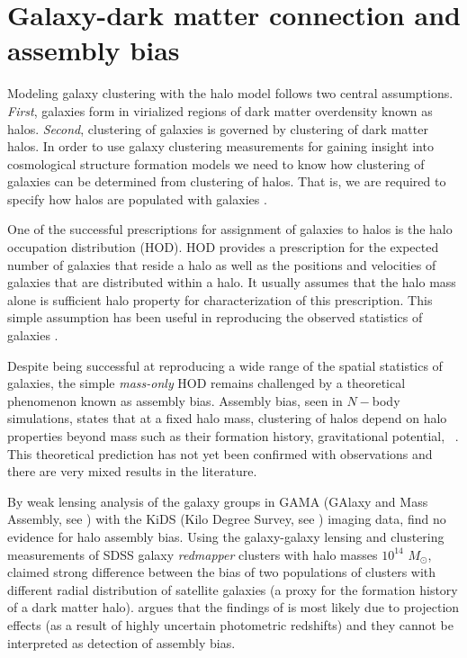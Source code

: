 \section{Galaxy-dark matter connection and assembly bias}

Modeling galaxy clustering with the halo model follows two central assumptions. \emph{First}, galaxies form in virialized regions of 
dark matter overdensity known as halos. \emph{Second}, clustering of galaxies is governed by clustering of dark matter halos. 
In order to use galaxy clustering measurements for gaining insight into cosmological structure formation models we need to 
know how clustering of galaxies can be determined from clustering of halos. That is, we are required to specify how halos 
are populated with galaxies \citep{seljak2000,scoccimarro2001,berlind_weinberg2002}.

One of the successful prescriptions for assignment of galaxies to halos is the halo occupation distribution (HOD). 
HOD provides a prescription for the expected number of galaxies that reside a halo as well as 
the positions and velocities of galaxies that are distributed within a halo. It usually assumes that the halo mass alone 
is sufficient halo property for characterization of this prescription. This simple assumption has been useful 
in reproducing the observed statistics of galaxies \citep{tinker_rsd2007,zehavi2011,zheng_guo}.

Despite being successful at reproducing a wide range of the spatial statistics of galaxies, the simple \emph{mass-only} HOD 
remains challenged by a theoretical phenomenon known as assembly bias. Assembly bias, seen in $N-$body simulations, states that at a fixed halo mass, clustering 
of halos depend on halo properties beyond mass such as their formation history, gravitational potential, \etc\ \citep{weschler2006,gao2007,arz2014,sunayama2016}.
This theoretical prediction has not yet been confirmed with observations and there are very mixed results in the literature.

By weak lensing analysis of the galaxy groups in GAMA (GAlaxy and Mass Assembly, see \citealt{driver}) 
with the KiDS (Kilo Degree Survey, see \citealt{kuijken2015}) imaging data, \citet{dvornik2017} find no evidence for halo assembly bias.
Using the galaxy-galaxy lensing and clustering measurements of SDSS galaxy \emph{redmapper} clusters \citep{rykoff} with halo masses $10^{14}$ $M_{\odot}$, 
\citet{miyatake2016} claimed strong difference between the bias of two populations of clusters with different radial distribution of satellite galaxies 
(a proxy for the formation history of a dark matter halo). \citet{zuetal2016} argues that the findings of \citet{miyatake2016} is most likely due to projection effects (as a result of highly uncertain photometric redshifts) and they cannot be interpreted as detection of assembly bias. 

